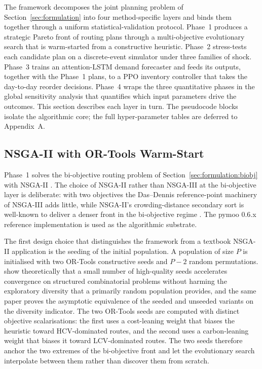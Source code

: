 \documentclass[review,preprint,authoryear,12pt]{elsarticle}
\begin{document}
The framework decomposes the joint planning problem of
Section~\ref{sec:formulation} into four method-specific layers and
binds them together through a uniform statistical-validation protocol.
Phase~1 produces a strategic Pareto front of routing plans through a
multi-objective evolutionary search that is warm-started from a
constructive heuristic. Phase~2 stress-tests each candidate plan on a
discrete-event simulator under three families of shock. Phase~3 trains
an attention-LSTM demand forecaster and feeds its outputs, together
with the Phase~1 plans, to a PPO inventory controller that takes the
day-to-day reorder decisions. Phase~4 wraps the three quantitative
phases in the global sensitivity analysis that quantifies which input
parameters drive the outcomes. This section describes each layer in
turn. The pseudocode blocks isolate the algorithmic core; the full
hyper-parameter tables are deferred to Appendix~A.

\subsection{NSGA-II with OR-Tools Warm-Start}
\label{sec:methodology:nsga2}

Phase~1 solves the bi-objective routing problem of
Section~\ref{sec:formulation:biobj} with NSGA-II
\citep{deb2002nsga2}. The choice of NSGA-II rather than NSGA-III at
the bi-objective layer is deliberate: with two objectives the
Das--Dennis reference-point machinery of NSGA-III adds little, while
NSGA-II's crowding-distance secondary sort is well-known to deliver a
denser front in the bi-objective regime \citep{debjain2014nsga3}. The
pymoo 0.6.x reference implementation \citep{blank2020pymoo} is used
as the algorithmic substrate.

The first design choice that distinguishes the framework from a
textbook NSGA-II application is the seeding of the initial
population. A population of size $P$ is initialised with two OR-Tools
constructive seeds and $P-2$ random permutations.
\citet{friedrich2014seeding} show theoretically that a small number
of high-quality seeds accelerates convergence on structured
combinatorial problems without harming the exploratory diversity that
a primarily random population provides, and the same paper proves the
asymptotic equivalence of the seeded and unseeded variants on the
diversity indicator. The two OR-Tools seeds are computed with
distinct objective scalarisations: the first uses a cost-leaning
weight that biases the heuristic toward HCV-dominated routes, and the
second uses a carbon-leaning weight that biases it toward
LCV-dominated routes. The two seeds therefore anchor the two extremes
of the bi-objective front and let the evolutionary search interpolate
between them rather than discover them from scratch.
\end{document}
